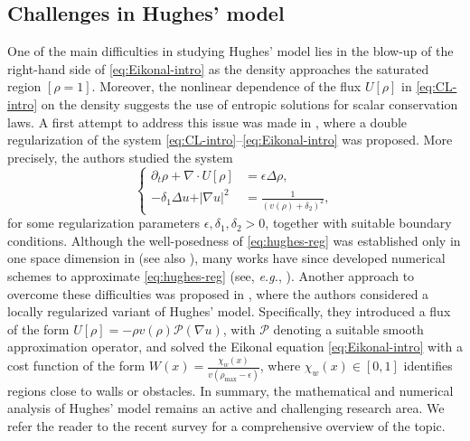 \documentclass[final,reqno]{amsart}
\theoremstyle{plain}
\theoremstyle{definition}
\theoremstyle{remark}
\numberwithin{remark}{section}	%
\numberwithin{example}{section}	%
\begin{document}
\subsection{Challenges in Hughes' model}\label{subsection:diff-hm}

One of the main difficulties in studying Hughes' model lies in the blow-up of the right-hand side of \eqref{eq:Eikonal-intro} as the density approaches the saturated region $[\rho = 1]$. Moreover, the nonlinear dependence of the flux $U[\rho]$ in \eqref{eq:CL-intro} on the density suggests the use of entropic solutions for scalar conservation laws.
A first attempt to address this issue was made in \cite{DiF}, where a double regularization of the system \eqref{eq:CL-intro}–\eqref{eq:Eikonal-intro} was proposed. More precisely, the authors studied the system
\begin{equation}\label{eq:hughes-reg}
	\left\lbrace
	\begin{aligned}
\partial_t \rho + \nabla \cdot U[\rho] &=\epsilon\Delta \rho, \\
-\delta_1\Delta u + \vert\nabla u\vert^2 &= \frac{1}{(v(\rho)+\delta_2)^2},
	\end{aligned}
	\right.
\end{equation}
for some regularization parameters $\epsilon, \delta_1, \delta_2 > 0$, together with suitable boundary conditions.
Although the well-posedness of \eqref{eq:hughes-reg} was established only in one space dimension in \cite{DiF} (see also \cite{AMADORI2012259, Hughs2}), many works have since developed numerical schemes to approximate \eqref{eq:hughes-reg} (see, \textit{e.g.}, \cite{Silvasim, SLHughs}).
Another approach to overcome these difficulties was proposed in \cite{carrillo2016improved}, where the authors considered a locally regularized variant of Hughes' model. Specifically, they introduced a flux of the form $U[\rho] = -\rho v(\rho)\mathcal{P}(\nabla u)$, with $\mathcal{P}$ denoting a suitable smooth approximation operator, and solved the Eikonal equation \eqref{eq:Eikonal-intro} with a cost function of the form $W(x) = \frac{\chi_w(x)}{v(\rho_{\max} - \epsilon)}$, where $\chi_w(x) \in [0,1]$ identifies regions close to walls or obstacles.
In summary, the mathematical and numerical analysis of Hughes' model remains an active and challenging research area. We refer the reader to the recent survey \cite{Amadori2023} for a comprehensive overview of the topic.
\end{document}
